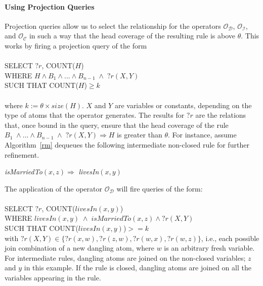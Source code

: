 \paragraph{Using Projection Queries} Projection queries allow us to select the relationship for the operators $\mathcal{O_D}$, $\mathcal{O_I}$, and $\mathcal{O_C}$ in such a way
that the head coverage of the resulting rule is above $\theta$.
 This works by firing a projection query of the form
\\ \\
SELECT $?r$, COUNT($H$)\\
WHERE $H \wedge B_1 \wedge ... \wedge B_{n-1}\; \wedge\; ?r(X,Y)$\\
SUCH THAT COUNT($H$)$\geq k$
\\ \\
where $k := \theta \times size(H)$. $X$ and $Y$ are variables or constants, depending on the type of atoms that the operator generates.
The results for $?r$ are the relations that, once bound in the query, ensure that the head coverage of the rule $B_1 \; \wedge ... \wedge B_{n-1} \;\wedge\; ?r(X,Y) \Rightarrow H$ is greater than $\theta$.
For instance, assume
Algorithm~\ref{rm} dequeues the following intermediate non-closed rule for further refinement.

\begin{center}
\emph{isMarriedTo}$(x,z) \Rightarrow $ \emph{livesIn}$(x,y)$
\end{center}

\noindent
The application of the operator $\mathcal{O_D}$ will fire queries of the form:\\ \\
SELECT $?r$, COUNT($livesIn(x,y)$)\\
WHERE $livesIn(x,y) \; \wedge \; isMarriedTo(x,z) \wedge ?r(X, Y)$\\
SUCH THAT COUNT($livesIn(x,y)$)$>= k$\\

\noindent with $?r(X, Y) \in \{?r(x,w), ?r(z,w), ?r(w,x), ?r(w,z) \}$, i.e., each possible join combination of a new dangling atom,
where $w$ is an arbitrary fresh variable. For intermediate rules, dangling atoms are joined on the non-closed variables; $z$ and $y$ in this example.
If the rule is closed, dangling atoms are joined on all the variables appearing in the rule.

